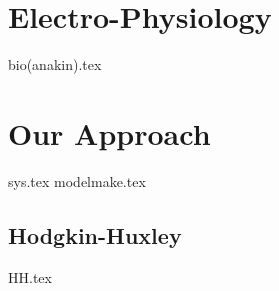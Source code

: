 


\chapter{Electro-Physiology}\label{ch:biophysics}
{bio(anakin).tex}


\chapter{Our Approach}\label{ch:approa}
{sys.tex}
{modelmake.tex}


\newpage
\section{Hodgkin-Huxley}\label{sec:hh}
{HH.tex}







